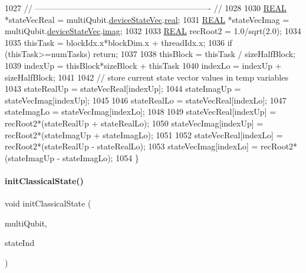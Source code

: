 \begin{DoxyCode}
1027     \textcolor{comment}{// ---------------------------------------------------------------- //}
1028 
1030     \mbox{\hyperlink{QuEST__precision_8h_a4b654506f18b8bfd61ad2a29a7e38c25}{REAL}} *stateVecReal = multiQubit.\mbox{\hyperlink{structMultiQubit_a59ac613486a41b8c9a4b6e79cc8d2cc3}{deviceStateVec}}.\mbox{\hyperlink{structComplexArray_a4195cac6c784ea1b6271f1c7dba1548a}{real}};
1031     \mbox{\hyperlink{QuEST__precision_8h_a4b654506f18b8bfd61ad2a29a7e38c25}{REAL}} *stateVecImag = multiQubit.\mbox{\hyperlink{structMultiQubit_a59ac613486a41b8c9a4b6e79cc8d2cc3}{deviceStateVec}}.\mbox{\hyperlink{structComplexArray_a79dde47c7ae530c79cebfdf57b225968}{imag}};
1032 
1033     \mbox{\hyperlink{QuEST__precision_8h_a4b654506f18b8bfd61ad2a29a7e38c25}{REAL}} recRoot2 = 1.0/sqrt(2.0);
1034 
1035     thisTask = blockIdx.x*blockDim.x + threadIdx.x;
1036     \textcolor{keywordflow}{if} (thisTask>=numTasks) \textcolor{keywordflow}{return};
1037 
1038     thisBlock   = thisTask / sizeHalfBlock;
1039     indexUp     = thisBlock*sizeBlock + thisTask%
1040     indexLo     = indexUp + sizeHalfBlock;
1041 
1042     \textcolor{comment}{// store current state vector values in temp variables}
1043     stateRealUp = stateVecReal[indexUp];
1044     stateImagUp = stateVecImag[indexUp];
1045 
1046     stateRealLo = stateVecReal[indexLo];
1047     stateImagLo = stateVecImag[indexLo];
1048 
1049     stateVecReal[indexUp] = recRoot2*(stateRealUp + stateRealLo);
1050     stateVecImag[indexUp] = recRoot2*(stateImagUp + stateImagLo);
1051 
1052     stateVecReal[indexLo] = recRoot2*(stateRealUp - stateRealLo);
1053     stateVecImag[indexLo] = recRoot2*(stateImagUp - stateImagLo);
1054 \}
\end{DoxyCode}
\mbox{\label{QuEST__env__localGPU_8cu_ae1b983b41249836ed2c2a81f77d83c40}} 
\paragraph{\texorpdfstring{init\+Classical\+State()}{initClassicalState()}}
{\footnotesize\ttfamily void init\+Classical\+State (\begin{DoxyParamCaption}\item[{\mbox{\hyperlink{structMultiQubit}{Multi\+Qubit}}}]{multi\+Qubit,  }\item[{long long int}]{state\+Ind }\end{DoxyParamCaption})}



